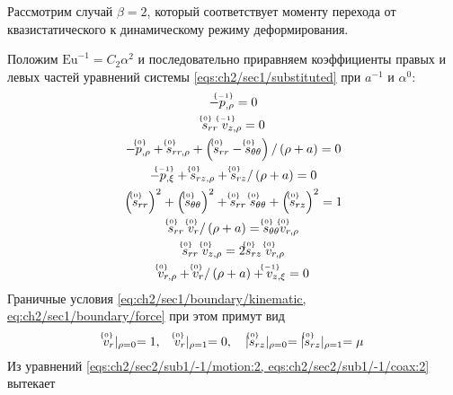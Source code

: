Рассмотрим случай $\beta=2$, который соответствует моменту перехода от квазистатического к динамическому режиму деформирования.

Положим $\text{Eu}^{-1} = C_2 \alpha^2$ и последовательно приравняем коэффициенты правых и левых частей уравнений системы \cref{eqs:ch2/sec1/substituted} при $a^{-1}$ и $\alpha^0$:
\begin{subequations}
  \label{eqs:ch2/sec2/sub1/main}
  \begin{gather}
    \label{eqs:ch2/sec2/sub1/-1/motion:2}
    -\uindex{p}{-1}_{,\rho} = 0
    \\
    \label{eqs:ch2/sec2/sub1/-1/coax:2}
    \uindex{s}{0}_{rr} \; \uindex{v}{-1}_{z,\rho} = 0
    \\
    \label{eqs:ch2/sec2/sub1/0/motion:1}
    -\uindex{p}{0}_{,\rho}+\uindex{s}{0}_{rr,\rho} + \left(\uindex{s}{0}_{rr}-\uindex{s}{0}_{\theta\theta}\right) / \left(\rho + a\right) = 0
    \\
    \label{eqs:ch2/sec2/sub1/0/motion:2}
    -\uindex{p}{-1}_{,\xi} + \uindex{s}{0}_{rz,\rho} + \uindex{s}{0}_{rz} / \left(\rho+a\right) = 0
    \\
    \label{eqs:ch2/sec2/sub1/0/plasticity}
    \left(\uindex{s}{0}_{rr}\right)^2 + \left(\uindex{s}{0}_{\theta\theta}\right)^2 + \uindex{s}{0}_{rr}\; \uindex{s}{0}_{\theta\theta} + \left(\uindex{s}{0}_{rz}\right)^2 = 1
    \\
    \label{eqs:ch2/sec2/sub1/0/coax:1}
    \uindex{s}{0}_{rr} \; \uindex{v}{0}_{r} / \left(\rho+a\right) = \uindex{s}{0}_{\theta\theta} \uindex{v}{0}_{r,\rho}
    \\
    \label{eqs:ch2/sec2/sub1/0/coax:2}
    \uindex{s}{0}_{rr} \; \uindex{v}{0}_{z,\rho} = 2 \uindex{s}{0}_{rz} \; \uindex{v}{0}_{r,\rho}
    \\
    \label{eqs:ch2/sec2/sub1/0/uncompress}
    \uindex{v}{0}_{r,\rho} + \uindex{v}{0}_{r} / \left(\rho+a\right) + \uindex{v}{-1}_{z,\xi} = 0
  \end{gather}
\end{subequations}
Граничные условия \cref{eq:ch2/sec1/boundary/kinematic, eq:ch2/sec1/boundary/force} при этом примут вид
\begin{equation}
  \label{eq:ch2/sec2/sub1/boundary/0}
  \uindex{v}{0}_{r}\lvert_{\rho=0} = 1,\quad \uindex{v}{0}_{r}\lvert_{\rho=1} = 0, \quad \lvert \uindex{s}{0}_{rz}\lvert_{\rho=0} = \lvert \uindex{s}{0}_{rz}\lvert_{\rho=1} = \mu
\end{equation}
Из уравнений \cref{eqs:ch2/sec2/sub1/-1/motion:2, eqs:ch2/sec2/sub1/-1/coax:2} вытекает
